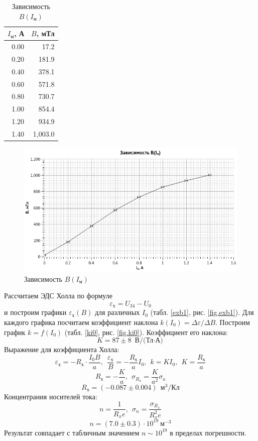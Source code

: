 \documentclass{article}
\begin{document}
   \begin{table}[h]
   \begin{center}
   \caption{Зависимость $B(I_{\text{м}})$}
   \label{t1}
   \begin{tabular}{|*{2}{r|}}
   \hline 
   $I_{\text{м}}$, А & $B$, мТл\\ \hline 
   0.00 & 17.2 \\ \hline 
   0.20 & 181.9 \\ \hline 
   0.40 & 378.1 \\ \hline 
   0.60 & 571.8 \\ \hline 
   0.80 & 730.7 \\ \hline 
   1.00 & 854.4 \\ \hline 
   1.20 & 934.9 \\ \hline 
   1.40 & 1,003.0 \\ \hline 
   \end{tabular}
   \end{center} 
   \end{table} 


   \begin{figure}[h]
   \centering
   \includegraphics[width=15cm]{plot1.png} 
   \caption{Зависимость $B(I_{\text{м}})$} 
   \label{fig.2} 
   \end{figure}

   Рассчитаем ЭДС Холла по формуле 
   $$ \varepsilon_{\text{х}} = U_{34} - U_0 $$
   и построим графики  $\varepsilon_{\text{х}}(B)$ для различных $I_0$ (табл. \ref{exb1}, рис. \ref{fig.exb1}). Для каждого графика посчитаем коэффициент наклона $k(I_0) = \Delta\varepsilon / \Delta B$. Построим график $k = f(I_0)$ (табл. \ref{ki0}, рис. \ref{fig.ki0}). Коэффициент его наклона:
   $$ K = 87 \pm 8 \text{ В/(Тл$\cdot$А)} $$
   Выражение для коэффициента Холла:
   $$ \varepsilon_{\text{х}} = -R_{\text{х}} \cdot \frac{I_0B}{a},~~ \frac{\varepsilon_{\text{х}}}{B} = -\frac{R_{\text{х}}}{a} I_0,~~ k = KI_0,~~ K = \frac{R_\text{х}}{a}$$ 
   $$ R_{\text{х}} = -\frac{K}{a},~~ \sigma_{R_\text{х}} = \frac{K}{a^2}\sigma_a $$
   $$ R_\text{х} = (-0.087 \pm 0.004) ~~\text{м}^3 / \text{Кл} $$
   Концентрания носителей тока:
   $$ n = \frac{1}{R_xe},~~ \sigma_n = \frac{\sigma_{R_x}}{R_x^2e} $$
   $$ n = (7.0 \pm 0.3) \cdot 10^{19} ~ \text{м}^{-3} $$
   Результат совпадает с табличным значением $n \sim 10^{19}$ в пределах погрешности.
\end{document}
